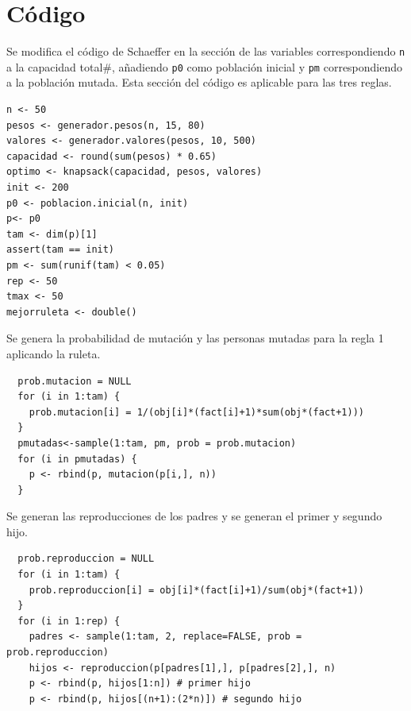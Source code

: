 \documentclass[12pt]{amsart}
\begin{document}
\newpage
\section{Código}
Se modifica el código de Schaeffer \cite{codigo} en la sección de las variables correspondiendo \texttt{n} a la capacidad total#, añadiendo \texttt{p0} como población inicial y \texttt{pm} correspondiendo a la población mutada. Esta sección del código es aplicable para las tres reglas.
\renewcommand{\listingscaption}{Código}
\begin{listing}[H]
  \begin{verbatim}
n <- 50
pesos <- generador.pesos(n, 15, 80)
valores <- generador.valores(pesos, 10, 500)
capacidad <- round(sum(pesos) * 0.65)
optimo <- knapsack(capacidad, pesos, valores)
init <- 200
p0 <- poblacion.inicial(n, init)
p<- p0
tam <- dim(p)[1]
assert(tam == init)
pm <- sum(runif(tam) < 0.05)
rep <- 50
tmax <- 50
mejorruleta <- double()
  \end{verbatim}
  \label{codigo1}
\end{listing}

Se genera la probabilidad de mutación y las personas mutadas para la regla 1 aplicando la ruleta.
\renewcommand{\listingscaption}{Código}
\begin{listing}[H]
  \begin{verbatim}
  prob.mutacion = NULL
  for (i in 1:tam) {
    prob.mutacion[i] = 1/(obj[i]*(fact[i]+1)*sum(obj*(fact+1)))
  }
  pmutadas<-sample(1:tam, pm, prob = prob.mutacion)
  for (i in pmutadas) {
    p <- rbind(p, mutacion(p[i,], n)) 
  }
  \end{verbatim}
  \label{codigo1}
\end{listing}

Se generan las reproducciones de los padres y se generan el primer y segundo hijo.
\renewcommand{\listingscaption}{Código}
\begin{listing}[H]
  \begin{verbatim}
  prob.reproduccion = NULL
  for (i in 1:tam) {
    prob.reproduccion[i] = obj[i]*(fact[i]+1)/sum(obj*(fact+1))
  }
  for (i in 1:rep) { 
    padres <- sample(1:tam, 2, replace=FALSE, prob = prob.reproduccion)
    hijos <- reproduccion(p[padres[1],], p[padres[2],], n)
    p <- rbind(p, hijos[1:n]) # primer hijo
    p <- rbind(p, hijos[(n+1):(2*n)]) # segundo hijo
  \end{verbatim}
  \label{codigo1}
\end{listing}
\end{document}
